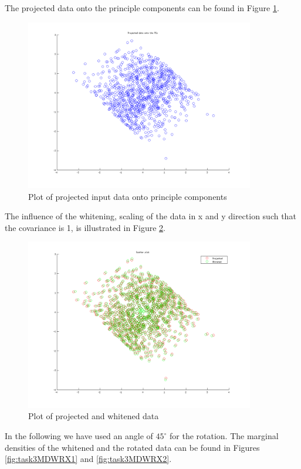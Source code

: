 \documentclass{article}
\begin{document}
		The projected data onto the principle components can be found in Figure \ref{fig:task3ProjectedData}.
		\begin{figure}[H]
			\centering
			\includegraphics[width=10cm]{task3ScatterProjectedData.png}
			\caption{Plot of projected input data onto principle components}
			\label{fig:task3ProjectedData}
		\end{figure}
		The influence of the whitening, scaling of the data in x and y direction such that the covariance is 1, is illustrated in Figure \ref{fig:task3ProjectedWhitened}.
		\begin{figure}[H]
			\centering
			\includegraphics[width=10cm]{task3ScatterPlotProjectedWhitened.png}
			\caption{Plot of projected and whitened data}
			\label{fig:task3ProjectedWhitened}
		\end{figure}
		In the following we have used an angle of $45^{\circ}$ for the rotation.
		The marginal densities of the whitened and the rotated data can be found in Figures \ref{fig:task3MDWRX1} and \ref{fig:task3MDWRX2}.
\end{document}
